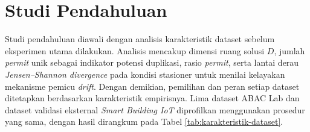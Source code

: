 \section{Studi Pendahuluan}

Studi pendahuluan diawali dengan analisis karakteristik dataset sebelum eksperimen utama dilakukan. 
Analisis mencakup dimensi ruang solusi $D$, jumlah \textit{permit} unik sebagai indikator potensi duplikasi, rasio \textit{permit}, serta lantai derau \textit{Jensen–Shannon divergence} pada kondisi stasioner untuk menilai kelayakan mekanisme pemicu \textit{drift}. 
Dengan demikian, pemilihan dan peran setiap dataset ditetapkan berdasarkan karakteristik empirisnya. 
Lima dataset ABAC Lab dan dataset validasi eksternal \textit{Smart Building IoT} diprofilkan menggunakan prosedur yang sama, dengan hasil dirangkum pada Tabel \ref{tab:karakteristik-dataset}.

